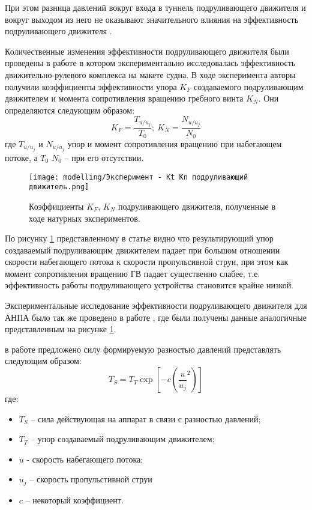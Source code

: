 При этом разница давлений вокруг входа в туннель подруливающего движителя и вокруг выходом из него не оказывают значительного влияния на эффективность подруливающего движителя \cite{brix1973lateral}.

Количественные изменения эффективности подруливающего движителя были проведены в работе \cite{chislett1966influence} в котором экспериментально исследовалась эффективность движительно-рулевого комплекса на макете судна.
В ходе эксперимента авторы получили коэффициенты эффективности упора $K_F$ создаваемого подруливающим движителем и момента сопротивления вращению гребного винта $K_N$.
Они определяются следующим образом:
\begin{equation*}
	K_F = \frac{T_{u/u_j}}{T_0}; \: K_N = \frac{N_{u/u_j}}{N_0}
\end{equation*}
\noindent где $T_{u/u_j}$ и $N_{u/u_j}$ упор и момент сопротивления вращению при набегающем потоке, а $T_0$ $N_0$ -- при его отсутствии.

\begin{figure}[ht]
    \centering
    \texttt{[image: modelling/Эксперимент - Kt Kn подруливающий движитель.png]}
    \caption{Коэффициенты $K_F$, $K_N$ подруливающего движителя, полученные в ходе натурных экспериментов.}
    \label{fig:tunnel_effectivness}
\end{figure}

По рисунку \ref{fig:tunnel_effectivness} представленному в статье \cite{chislett1966influence} видно что результирующий упор создаваемый подруливающим движителем падает при большом отношении скорости набегающего потока к скорости пропульсивной струи, при этом как момент сопротивления вращению ГВ падает существенно слабее, т.е. эффективность работы подруливающего устройства становится крайне низкой.

Экспериментальные исследование эффективности подруливающего движителя для АНПА было так же проведено в работе \cite{beveridge1972design}, где были получены данные аналогичные представленным на рисунке \ref{fig:tunnel_effectivness}.

в работе \cite{palmer2009analysis} предложено силу формируемую разностью давлений представлять следующим образом:
\begin{equation*}
	T_S = T_T \exp \left[ -c \left( \frac{u}{u_j}^2 \right) \right]
\end{equation*}
\noindent где:
\begin{itemize}
	\item $T_S$ -- сила действующая на аппарат в связи с разностью давлений;
	\item $T_T$ -- упор создаваемый подруливающим движителем;
	\item $u$ - скорость набегающего потока;
	\item $u_j$ -- скорость пропульстивной струи
	\item $c$ -- некоторый коэффициент.
\end{itemize}


